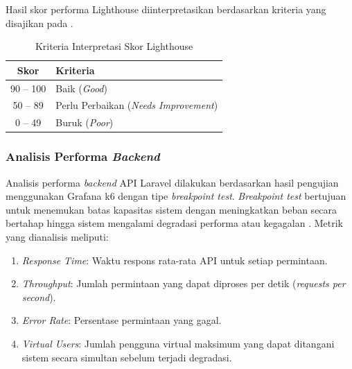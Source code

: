 Hasil skor performa Lighthouse diinterpretasikan berdasarkan kriteria yang disajikan pada .

\begin{table}[H]
	\centering
	\caption{Kriteria Interpretasi Skor Lighthouse}
	\label{tab:kriteria_lighthouse}
	\begin{tabular}{|c|l|}
		\hline
		\textbf{Skor} & \textbf{Kriteria}                            \\
		\hline
		90 -- 100     & Baik (\textit{Good})                         \\
		\hline
		50 -- 89      & Perlu Perbaikan (\textit{Needs Improvement}) \\
		\hline
		0 -- 49       & Buruk (\textit{Poor})                        \\
		\hline
	\end{tabular}
\end{table}

\subsubsection{Analisis Performa \textit{Backend}}

Analisis performa \textit{backend} API Laravel dilakukan berdasarkan hasil pengujian menggunakan Grafana k6 dengan tipe \textit{breakpoint test}. \textit{Breakpoint test} bertujuan untuk menemukan batas kapasitas sistem dengan meningkatkan beban secara bertahap hingga sistem mengalami degradasi performa atau kegagalan \citep{Grafana_2026_k6}. Metrik yang dianalisis meliputi:
\begin{enumerate}[label=\alph*.]
	\item \textit{Response Time}: Waktu respons rata-rata API untuk setiap permintaan.
	\item \textit{Throughput}: Jumlah permintaan yang dapat diproses per detik (\textit{requests per second}).
	\item \textit{Error Rate}: Persentase permintaan yang gagal.
	\item \textit{Virtual Users}: Jumlah pengguna virtual maksimum yang dapat ditangani sistem secara simultan sebelum terjadi degradasi.
\end{enumerate}


